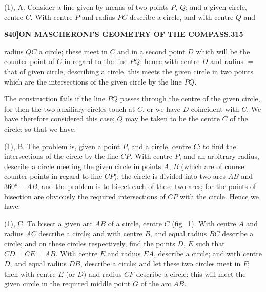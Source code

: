 \documentclass[11pt,a4paper]{book}
\begin{document}
(1), A. Consider a line given by means of two points $P$, $Q$; and a given circle, centre $C$. With centre $P$ and radius $PC$ describe a circle, and with centre $Q$ and

\newpage
\setcounter{page}{315}

\noindent\textbf{840]}\hfill\textbf{ON MASCHERONI'S GEOMETRY OF THE COMPASS.}\hfill\textbf{315}

\bigskip

\noindent radius $QC$ a circle; these meet in $C$ and in a second point $D$ which will be the counter-point of $C$ in regard to the line $PQ$; hence with centre $D$ and radius $=$ that of given circle, describing a circle, this meets the given circle in two points which are the intersections of the given circle by the line $PQ$.

The construction fails if the line $PQ$ passes through the centre of the given circle, for then the two auxiliary circles touch at $C$, or we have $D$ coincident with $C$. We have therefore considered this case; $Q$ may be taken to be the centre $C$ of the circle; so that we have:

(1), B. The problem is, given a point $P$, and a circle, centre $C$: to find the intersections of the circle by the line $CP$. With centre $P$, and an arbitrary radius, describe a circle meeting the given circle in points $A$, $B$ (which are of course counter points in regard to line $CP$); the circle is divided into two arcs $AB$ and $360° - AB$, and the problem is to bisect each of these two arcs; for the points of bisection are obviously the required intersections of $CP$ with the circle. Hence we have:

(1), C. To bisect a given arc $AB$ of a circle, centre $C$ (fig.\ 1). With centre $A$ and radius $AC$ describe a circle; and with centre $B$, and equal radius $BC$ describe a circle; and on these circles respectively, find the points $D$, $E$ such that $CD = CE = AB$. With centre $E$ and radius $EA$, describe a circle; and with centre $D$, and equal radius $DB$, describe a circle; and let these two circles meet in $F$; then with centre $E$ (or $D$) and radius $CF$ describe a circle: this will meet the given circle in the required middle point $G$ of the arc $AB$.

\begin{figure}[H]
\centering
{}
\end{figure}
\end{document}
